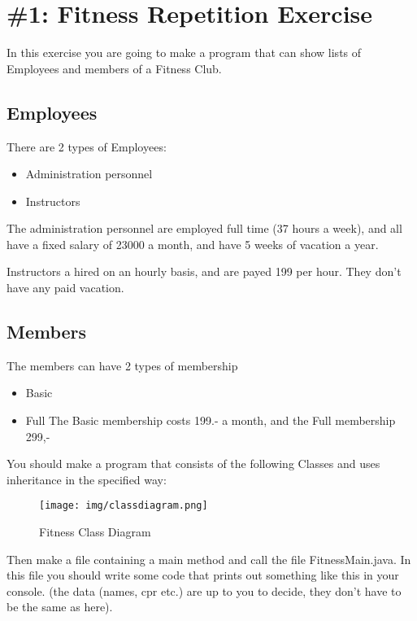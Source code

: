 \hypertarget{fitness-repetition-exercise}{%
\section{\#1: Fitness Repetition
Exercise}\label{fitness-repetition-exercise}}

In this exercise you are going to make a program that can show lists of
Employees and members of a Fitness Club.

\hypertarget{employees}{%
\subsection{Employees}\label{employees}}

There are 2 types of Employees:

\begin{itemize}
\tightlist
\item
  Administration personnel
\item
  Instructors
\end{itemize}

The administration personnel are employed full time (37 hours a week),
and all have a fixed salary of 23000 a month, and have 5 weeks of
vacation a year.

Instructors a hired on an hourly basis, and are payed 199 per hour. They
don't have any paid vacation.

\hypertarget{members}{%
\subsection{Members}\label{members}}

The members can have 2 types of membership

\begin{itemize}
\tightlist
\item
  Basic
\item
  Full The Basic membership costs 199.- a month, and the Full membership
  299,-
\end{itemize}

You should make a program that consists of the following Classes and
uses inheritance in the specified way:

\begin{figure}
\centering
\texttt{[image: img/classdiagram.png]}
\caption{Fitness Class Diagram}
\end{figure}

Then make a file containing a main method and call the file
FitnessMain.java. In this file you should write some code that prints
out something like this in your console. (the data (names, cpr etc.) are
up to you to decide, they don't have to be the same as here).

